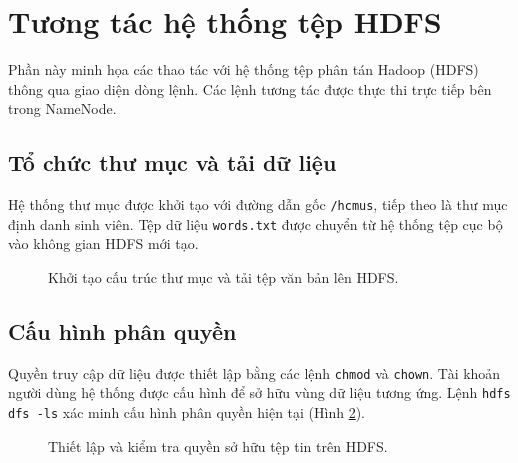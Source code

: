 \section{Tương tác hệ thống tệp HDFS}

Phần này minh họa các thao tác với hệ thống tệp phân tán Hadoop (HDFS) \cite{ghemawat2003google} thông qua giao diện dòng lệnh. Các lệnh tương tác được thực thi trực tiếp bên trong NameNode.

\subsection{Tổ chức thư mục và tải dữ liệu}
Hệ thống thư mục được khởi tạo với đường dẫn gốc \texttt{/hcmus}, tiếp theo là thư mục định danh sinh viên. Tệp dữ liệu \texttt{words.txt} được chuyển từ hệ thống tệp cục bộ vào không gian HDFS mới tạo.

\begin{figure}[H]
    \centering
    \caption{Khởi tạo cấu trúc thư mục và tải tệp văn bản lên HDFS.}
    \label{fig:hdfs_setup}
\end{figure}

\subsection{Cấu hình phân quyền}
Quyền truy cập dữ liệu được thiết lập bằng các lệnh \texttt{chmod} và \texttt{chown}. Tài khoản người dùng hệ thống được cấu hình để sở hữu vùng dữ liệu tương ứng. Lệnh \texttt{hdfs dfs -ls} xác minh cấu hình phân quyền hiện tại (Hình \ref{fig:hdfs_permissions}).

\begin{figure}[H]
    \centering
    \caption{Thiết lập và kiểm tra quyền sở hữu tệp tin trên HDFS.}
    \label{fig:hdfs_permissions}
\end{figure}

